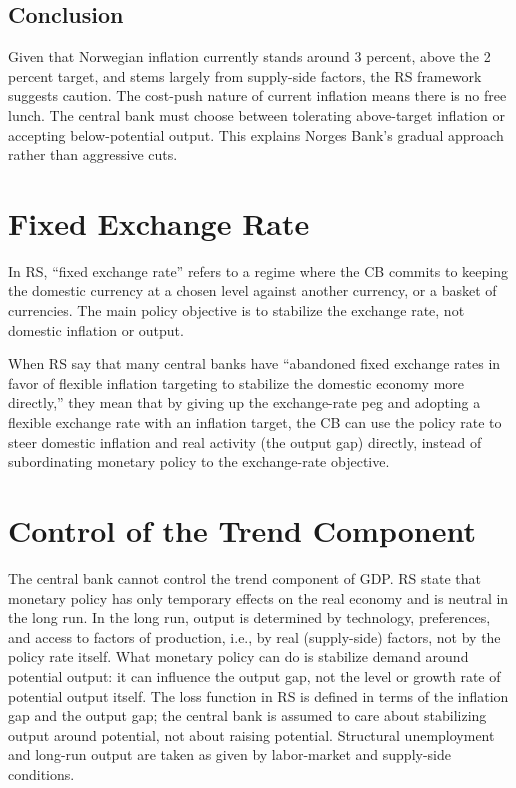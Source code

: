 \documentclass[10pt]{article}
\begin{document}
\subsection{Conclusion}

Given that Norwegian inflation currently stands around 3 percent, above the 2 percent target, and stems largely from supply-side factors, the RS framework suggests caution. The cost-push nature of current inflation means there is no free lunch. The central bank must choose between tolerating above-target inflation or accepting below-potential output. This explains Norges Bank's gradual approach rather than aggressive cuts.

\section{Fixed Exchange Rate}
In RS, ``fixed exchange rate'' refers to a regime where the CB commits to keeping the domestic currency at a chosen level against another currency, or a basket of currencies. The main policy objective is to stabilize the exchange rate, not domestic inflation or output. 

When RS say that many central banks have ``abandoned fixed exchange rates in favor of flexible inflation targeting to stabilize the domestic economy more directly,'' they mean that by giving up the exchange-rate peg and adopting a flexible exchange rate with an inflation target, the CB can use the policy rate to steer domestic inflation and real activity (the output gap) directly, instead of subordinating monetary policy to the exchange-rate objective.
\newpage 
\section{Control of the Trend Component}
The central bank cannot control the trend component of GDP. RS state that monetary policy has only temporary effects on the real economy and is neutral in the long run. In the long run, output is determined by technology, preferences, and access to factors of production, i.e., by real (supply-side) factors, not by the policy rate itself. What monetary policy can do is stabilize demand around potential output: it can influence the output gap, not the level or growth rate of potential output itself. The loss function in RS is defined in terms of the inflation gap and the output gap; the central bank is assumed to care about stabilizing output around potential, not about raising potential. Structural unemployment and long-run output are taken as given by labor-market and supply-side conditions. 
\end{document}

